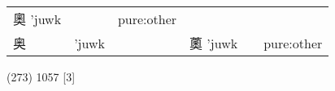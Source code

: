 \documentclass[14pt,a4paper]{scrartcl}
\begin{document}
\begin{longtable}[c]{@{}llllll@{}}
\begin{minipage}[t]{0.14\columnwidth}\raggedright\strut
奧 'juwk
\strut\end{minipage} &
\begin{minipage}[t]{0.14\columnwidth}\raggedright\strut
\strut\end{minipage} &
\begin{minipage}[t]{0.14\columnwidth}\raggedright\strut
pure:other
\strut\end{minipage}\tabularnewline
\begin{minipage}[t]{0.14\columnwidth}\raggedright\strut
奥
\strut\end{minipage} &
\begin{minipage}[t]{0.14\columnwidth}\raggedright\strut
'juwk
\strut\end{minipage} &
\begin{minipage}[t]{0.14\columnwidth}\raggedright\strut
\strut\end{minipage} &
\begin{minipage}[t]{0.14\columnwidth}\raggedright\strut
薁 'juwk
\strut\end{minipage} &
\begin{minipage}[t]{0.14\columnwidth}\raggedright\strut
\strut\end{minipage} &
\begin{minipage}[t]{0.14\columnwidth}\raggedright\strut
pure:other
\strut\end{minipage}\tabularnewline
\bottomrule
\end{longtable}

(273) 1057 {[}3{]}
\end{document}
